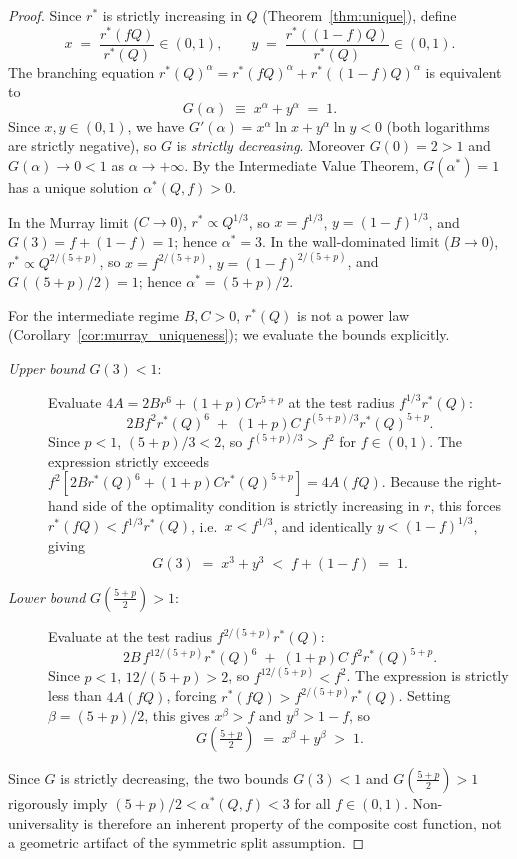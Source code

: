 \documentclass[10pt,a4paper]{amsart}
\begin{document}
\begin{proof}
Since $r^*$ is strictly increasing in $Q$ (Theorem~\ref{thm:unique}), define
\[
  x \;=\; \frac{r^*(fQ)}{r^*(Q)}\in(0,1), \qquad
  y \;=\; \frac{r^*((1-f)Q)}{r^*(Q)}\in(0,1).
\]
The branching equation $r^*(Q)^\alpha = r^*(fQ)^\alpha + r^*((1-f)Q)^\alpha$ is
equivalent to
\[
  G(\alpha) \;\equiv\; x^\alpha + y^\alpha \;=\; 1.
\]
Since $x,y\in(0,1)$, we have $G'(\alpha) = x^\alpha\ln x + y^\alpha\ln y < 0$
(both logarithms are strictly negative), so $G$ is \emph{strictly decreasing}.
Moreover $G(0)=2>1$ and $G(\alpha)\to0<1$ as $\alpha\to+\infty$.
By the Intermediate Value Theorem, $G(\alpha^*)=1$ has a unique solution
$\alpha^*(Q,f)>0$.

In the Murray limit ($C\to0$), $r^*\propto Q^{1/3}$, so $x=f^{1/3}$,
$y=(1-f)^{1/3}$, and $G(3)=f+(1-f)=1$; hence $\alpha^*=3$.
In the wall-dominated limit ($B\to0$), $r^*\propto Q^{2/(5+p)}$, so
$x=f^{2/(5+p)}$, $y=(1-f)^{2/(5+p)}$, and $G((5+p)/2)=1$; hence
$\alpha^*=(5+p)/2$.

For the intermediate regime $B,C>0$, $r^*(Q)$ is not a power law
(Corollary~\ref{cor:murray_uniqueness}); we evaluate the bounds explicitly.

\begin{description}
\item[\normalfont\emph{Upper bound} $G(3)<1$:\;]
Evaluate $4A = 2Br^6+(1+p)Cr^{5+p}$ at the test radius $f^{1/3}r^*(Q)$:
\[
  2B f^2 r^*(Q)^6 \;+\; (1+p)C\, f^{(5+p)/3} r^*(Q)^{5+p}.
\]
Since $p<1$, $(5+p)/3 < 2$, so $f^{(5+p)/3} > f^2$ for $f\in(0,1)$.
The expression strictly exceeds $f^2[2Br^*(Q)^6+(1+p)Cr^*(Q)^{5+p}]=4A(fQ)$.
Because the right-hand side of the optimality condition is strictly increasing
in $r$, this forces $r^*(fQ) < f^{1/3}r^*(Q)$, i.e.\ $x<f^{1/3}$, and
identically $y<(1-f)^{1/3}$, giving
\[
  G(3) \;=\; x^3 + y^3 \;<\; f + (1-f) \;=\; 1.
\]

\item[\normalfont\emph{Lower bound} $G\!\left(\tfrac{5+p}{2}\right)>1$:\;]
Evaluate at the test radius $f^{2/(5+p)}r^*(Q)$:
\[
  2B\, f^{12/(5+p)} r^*(Q)^6 \;+\; (1+p)C\, f^2 r^*(Q)^{5+p}.
\]
Since $p<1$, $12/(5+p)>2$, so $f^{12/(5+p)}<f^2$.
The expression is strictly less than $4A(fQ)$, forcing
$r^*(fQ) > f^{2/(5+p)}r^*(Q)$.
Setting $\beta=(5+p)/2$, this gives $x^\beta > f$ and $y^\beta > 1-f$, so
\[
  G\!\left(\tfrac{5+p}{2}\right) \;=\; x^\beta + y^\beta \;>\; 1.
\]
\end{description}

Since $G$ is strictly decreasing, the two bounds
$G(3)<1$ and $G\!\left(\tfrac{5+p}{2}\right)>1$ rigorously imply
$(5+p)/2 < \alpha^*(Q,f) < 3$ for all $f\in(0,1)$.
Non-universality is therefore an inherent property of the composite cost
function, not a geometric artifact of the symmetric split assumption.
\end{proof}
\end{document}
